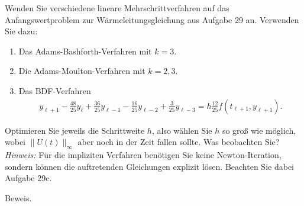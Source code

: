 \begin{exercise}
Wenden Sie verschiedene lineare Mehrschrittverfahren auf das Anfangswertproblem zur
Wärmeleitungsgleichung aus Aufgabe 29 an. Verwenden Sie dazu:
\begin{enumerate}[label = \textbf{\alph*)}]
  \item Das Adams-Bashforth-Verfahren mit $k = 3$.
  \item Die Adams-Moulton-Verfahren mit $k = 2,3$.
  \item Das BDF-Verfahren
  \begin{align*}
    y_{\ell + 1} - \frac{48}{25}y_{\ell} + \frac{36}{25}y_{\ell - 1} - \frac{16}{25}y_{\ell - 2}
    + \frac{3}{25}y_{\ell - 3} = h\frac{12}{25}f(t_{\ell + 1},y_{\ell + 1}).
  \end{align*}
\end{enumerate}
Optimieren Sie jeweils die Schrittweite $h$, also wählen Sie $h$ so groß wie möglich,
wobei $\|U(t)\|_{\infty}$ aber noch in der Zeit fallen sollte. Was beobachten Sie? \\
\textit{Hinweis:} Für die impliziten Verfahren benötigen Sie keine Newton-Iteration,
sondern können die auftretenden Gleichungen explizit lösen. Beachten Sie dabei Aufgabe 29c.
\end{exercise}
\begin{solution}
Beweis.
\end{solution}
